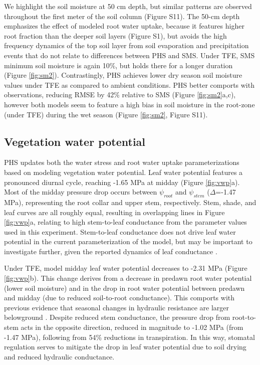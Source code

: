 \documentclass[draft,linenumbers]{agujournal}
\begin{document}
We highlight the soil moisture at 50 cm depth, but similar patterns are observed throughout the first meter of the soil column (Figure S11).
The 50-cm depth emphasizes the effect of modeled root water uptake, because it features higher root fraction than the deeper soil layers (Figure S1), 
but avoids the high frequency dynamics of the top soil layer from soil evaporation and precipitation events that do not relate to differences between PHS and SMS.
Under TFE, SMS minimum soil moisture is again 10\%, but holds there for a longer duration (Figure \ref{fig:sm2}).
Contrastingly, PHS achieves lower dry season soil moisture values under TFE as compared to ambient conditions.
PHS better comports with observations, reducing RMSE by 42\% relative to SMS (Figure \ref{fig:sm2}a,c),
however both models seem to feature a high bias in soil moisture in the root-zone (under TFE) during the wet season (Figure \ref{fig:sm2}, Figure S11).

\subsection{Vegetation water potential}

PHS updates both the water stress and root water uptake parameterizations based on modeling vegetation water potential.
Leaf water potential features a pronounced diurnal cycle, reaching -1.65 MPa at midday (Figure \ref{fig:vwp}a).
Most of the midday pressure drop occurs between $\psi_{root}$ and $\psi_{stem}$ ($\Delta$=-1.47 MPa), representing the root collar and upper stem, respectively.
Stem, shade, and leaf curves are all roughly equal, resulting in overlapping lines in Figure \ref{fig:vwp}a, relating to high stem-to-leaf conductance from the parameter values used in this experiment.
Stem-to-leaf conductance does not drive leaf water potential in the current parameterization of the model, but may be important to investigate further, given the reported dynamics of leaf conductance \citep{simonin2015}. 
    
    Under TFE, model midday leaf water potential decreases to -2.31 MPa (Figure \ref{fig:vwp}b). 
    This change derives from a decrease in predawn root water potential (lower soil moisture) and in the drop in root water potential between predawn and midday (due to reduced soil-to-root conductance).
    This comports with previous evidence that seasonal changes in hydraulic resistance are larger belowground \citep{fisher2006}.
    Despite reduced stem conductance, the pressure drop from root-to-stem acts in the opposite direction, reduced in magnitude to -1.02 MPa (from -1.47 MPa), following from 54\% reductions in transpiration.
    In this way, stomatal regulation serves to mitigate the drop in leaf water potential due to soil drying and reduced hydraulic conductance. 
\end{document}
